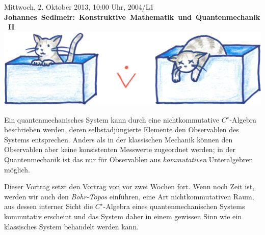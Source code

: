 \documentclass[a4paper,ngerman,landscape]{scrartcl}
\begin{document}
\begin{center}
  \huge
  Mittwoch, 2. Oktober 2013, 10:00 Uhr, 2004/L1 \\
  \mbox{\textbf{Johannes Sedlmeir: Konstruktive Mathematik und Quantenmechanik II}}
  \vfill
  \includegraphics[scale=1.2]{schroedingers-katze}
  \vfill

  \Large
  \begin{minipage}{0.94\textwidth}
    \setlength\parskip{\medskipamount}
    Ein quantenmechanisches System kann durch eine nichtkommutative
    $C^\star$-Algebra beschrieben werden, \mbox{deren} selbstadjungierte Elemente den
    Observablen des Systems entsprechen. Anders als in der klassischen Mechanik
    können den Observablen aber keine konsistenten Messwerte zugeordnet werden;
    in der Quantenmechanik ist das nur für Observablen aus \emph{kommutativen}
    Unteralgebren möglich.

    Dieser Vortrag setzt den Vortrag von vor zwei Wochen fort. Wenn noch Zeit
    ist, werden wir auch den \emph{Bohr-Topos} einführen, eine Art
    nichtkommutativen Raum, aus dessen interner Sicht die $C^\star$-Algebra
    eines quantenmechanischen Systems kommutativ erscheint und das System daher
    in einem gewissen Sinn wie ein klassisches System behandelt werden kann.
  \end{minipage}
\end{center}

\newpage
\end{document}
